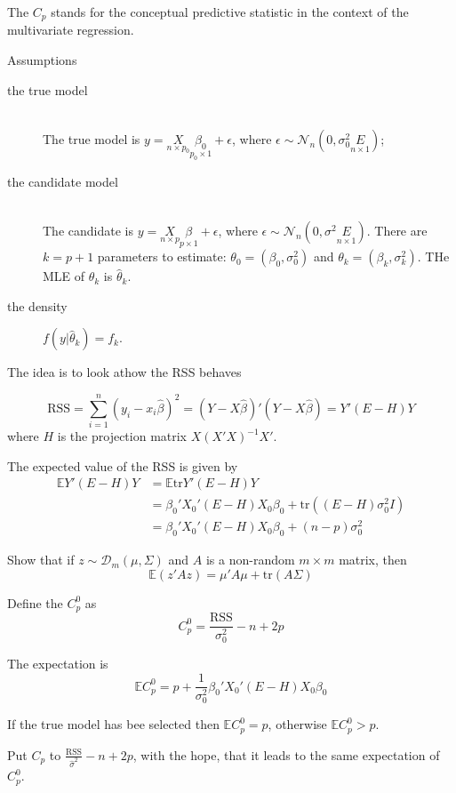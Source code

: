 \documentclass[a4paper]{article}
\newcommand{\brac}[1]{{\left ( #1 \right )}}
\newcommand{\induc}[1]{{\left . #1 \right \vert}}
\newcommand{\Dcal}{\mathcal{D}}
\newcommand{\Ncal}{\mathcal{N}}
\newcommand{\Ex}[0]{{\mathbb{E}}}
\newcommand{\RSS}{\text{RSS}}
\newcommand{\tr}{\text{tr}}
\begin{document}
The $C_p$ stands for the conceptual predictive statistic in the context of the multivariate regression.

Assumptions \begin{description}
	\item[the true model]\hfill\\
	The true model is $y = \underset{n\times p_0}{X}\underset{p_0\times 1}{\beta_0} + \epsilon$, where $\epsilon \sim \Ncal_n\brac{0,\sigma_0^2 \underset{n\times 1}{E}}$;
	\item[the candidate model] \hfill\\
	The candidate is $y = \underset{n\times p}{X}\underset{p\times 1}{\beta} + \epsilon$, where $\epsilon \sim \Ncal_n\brac{0,\sigma^2 \underset{n\times 1}{E}}$.
	There are $k=p+1$ parameters to estimate: $\theta_0 = \brac{\beta_0,\sigma_0^2}$ and $\theta_k = \brac{\beta_k,\sigma_k^2}$. THe MLE of $\theta_k$ is $\hat{\theta}_k$.
	\item[the density] $f\brac{\induc{y}\hat{\theta}_k} = f_k$.
\end{description}

The idea is to look athow the RSS behaves

\[\RSS = \sum_{i=1}^n \brac{y_i - x_i \hat{\beta}}^2 = \brac{Y-X\hat{\beta}}'\brac{Y-X\hat{\beta}} = Y'\brac{E-H}Y\]
where $H$ is the projection matrix $X\brac{X'X}^{-1}X'$.

The expected value of the RSS is given by
\begin{align*}
	\Ex Y'\brac{E-H}Y &= \Ex\tr{Y'\brac{E-H}Y} \\
		&= \beta_0'X_0' \brac{E-H} X_0\beta_0 + \tr\brac{\brac{E-H} \sigma^2_0 I}\\
		&= \beta_0'X_0' \brac{E-H} X_0\beta_0 + (n-p)\sigma^2_0
\end{align*}

Show that if $z\sim \Dcal_m\brac{\mu,\Sigma}$ and $A$ is a non-random $m\times m$ matrix, then
\[\Ex\brac{z'Az} = \mu'A\mu + \tr\brac{A\Sigma}\] 

Define the $C_p^0$ as
\[C_p^0 = \frac{\RSS}{\sigma^2_0} - n + 2p\]

The expectation is 
\[\Ex C_p^0 = p + \frac{1}{\sigma^2_0} \beta_0'X_0' \brac{E-H} X_0\beta_0\]

If the true model has bee selected then $\Ex C_p^0 = p$, otherwise $\Ex C_p^0 > p$.

Put $C_p$ to $\frac{\RSS}{\hat{\sigma}^2} - n + 2p$, with the hope, that it leads to the same expectation of $C_p^0$.
\end{document}

